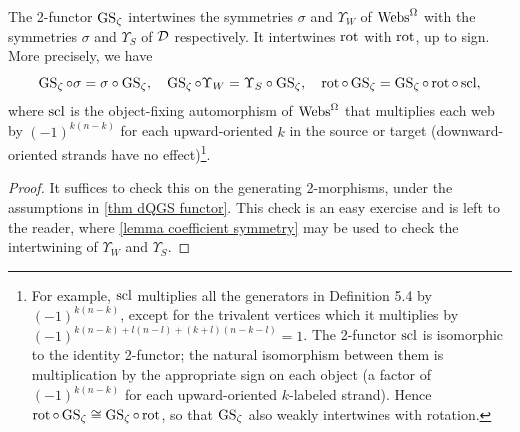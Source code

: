 \begin{lemma}\label{lemma symmetry of GS-zeta}
The 2-functor $\operatorname{GS}_\zeta$ intertwines the symmetries $\sigma$ and $\Upsilon_W$ of $\operatorname{Webs}^{\Omega}$ with the symmetries $\sigma$ and $\Upsilon_S$ of $\mathcal{D}$ respectively. It intertwines $\operatorname{rot}$ with $\operatorname{rot}$, up to sign. More precisely, we have 
\begin{equation}\label{eq GS-zeta intertwines symmetries}
\operatorname{GS}_\zeta \circ \sigma=\sigma \circ \operatorname{GS}_\zeta, \quad \operatorname{GS}_\zeta \circ \Upsilon_W=\Upsilon_S \circ \operatorname{GS}_\zeta,  \quad \operatorname{rot} \circ \operatorname{GS}_{\zeta} = \operatorname{GS}_{\zeta} \circ \operatorname{rot} \circ \operatorname{scl},
\end{equation} 
where $\operatorname{scl}$ is the object-fixing automorphism of $\operatorname{Webs}^{\Omega}$ that multiplies each web by $(-1)^{k(n-k)}$ for each upward-oriented $k$ in the source or target (downward-oriented strands have no effect)\footnote{For example, $\operatorname{scl}$ multiplies all the generators in Definition 5.4 by $(-1)^{k(n-k)}$, except for the trivalent vertices which it multiplies by $(-1)^{k(n-k) + l(n-l) + (k+l)(n-k-l)} = 1$. The 2-functor $\operatorname{scl}$ is isomorphic to the identity 2-functor; the natural isomorphism between them is multiplication by the appropriate sign on each object (a factor of $(-1)^{k(n-k)}$ for each upward-oriented $k$-labeled strand). Hence $\operatorname{rot}\circ\operatorname{GS}_\zeta\cong\operatorname{GS}_\zeta \circ \operatorname{rot}$, so that $\operatorname{GS}_\zeta$ also weakly intertwines with rotation.}.
\end{lemma}

\begin{proof}
    It suffices to check this on the generating 2-morphisms, under the assumptions in \cref{thm dQGS functor}. This check is an easy exercise and is left to the reader, where \cref{lemma coefficient symmetry} may be used to check the intertwining of $\Upsilon_W$ and $\Upsilon_S$.

\end{proof}

